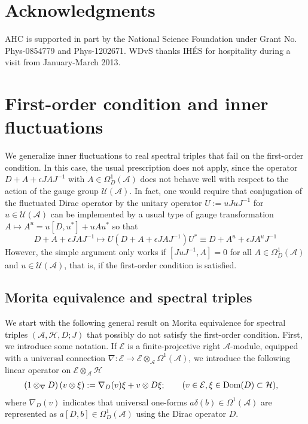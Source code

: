 \documentclass[preprint]{revtex4}
\begin{document}
\section{Acknowledgments} AHC is supported in part by the National Science
Foundation under Grant No. Phys-0854779 and Phys-1202671. WDvS thanks IH\'ES for hospitality during a visit from January-March 2013.

\section{First-order condition and inner fluctuations}
We generalize inner fluctuations to real spectral triples that fail on the first-order condition. In this case, the usual prescription \cite{C96} does not apply, since the operator $D+A+\epsilon JAJ^{-1}$ with $A \in \Omega^1_D({\mathcal{A}})$ does not behave well with respect to the action of the gauge group ${\mathcal{U}}({\mathcal{A}})$. In fact, one would require that conjugation of the fluctuated Dirac operator by the unitary operator $U:=u Ju J^{-1}$ for $u \in {\mathcal{U}}({\mathcal{A}})$ can be implemented by a usual type of gauge transformation $A \mapsto A^u = u[D,u^*]+ uAu^*$ so that
$$
D+A+\epsilon JAJ^{-1} \mapsto
U (D+A+\epsilon JAJ^{-1}) U^* \equiv D+A^u +\epsilon  JA^uJ^{-1}
$$
However, the simple argument only works if $[JuJ^{-1},A] = 0$ for all $A\in \Omega^1_D({\mathcal{A}})$ and $u \in {\mathcal{U}}({\mathcal{A}})$, that is, if the first-order condition is satisfied.

\subsection{Morita equivalence and spectral triples}
We start with the following general result on Morita equivalence for spectral triples $({\mathcal{A}},{\mathcal{H}},D;J)$ that possibly do not satisfy the first-order condition. First, we introduce some notation. If ${\mathcal{E}}$ is a finite-projective right ${\mathcal{A}}$-module, equipped with a universal connection $\nabla: {\mathcal{E}} \to {\mathcal{E}} \otimes_{\mathcal{A}} \Omega^1({\mathcal{A}})$, we introduce the following linear operator on ${\mathcal{E}} \otimes_{\mathcal{A}} {\mathcal{H}}$
\begin{align*}
\left( 1 \otimes_\nabla D \right)(v \otimes \xi) &:= \nabla_D(v) \xi + v \otimes D \xi; \qquad (v \in {\mathcal{E}}, \xi \in {{\rm Dom}}(D)\subset{\mathcal{H}}),
\end{align*}
where $\nabla_D(v)$ indicates that universal one-forms $ a\delta(b) \in \Omega^1({\mathcal{A}})$ are represented as $a[D,b]\in \Omega^1_D({\mathcal{A}})$ using the Dirac operator $D$.
\end{document}
